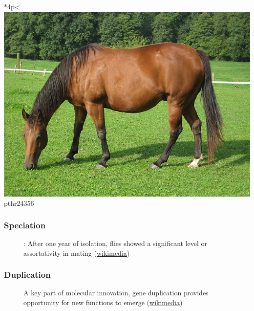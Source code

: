 \documentclass[aspectratio=169, 10pt]{beamer}
\begin{document}
\begin{frame}
\begin{table}
\begin{tabular}{*{4}{p{\tmpwidth}<\centering}}
\includegraphics[width=1\linewidth]{horse.jpg} \linebreak pthr24356
\end{tabular}
\end{table}


\end{frame}

\begin{frame}
\frametitle{Speciation}
\begin{figure}
\centering
\def\svgwidth{.8\linewidth}
\tiny

\caption{: After one year of isolation, flies showed a significant level or assortativity in mating (\href{https://commons.wikimedia.org/wiki/File:Drosophila_speciation_experiment.svg}{wikimedia})}
\end{figure}
\end{frame}

\begin{frame}
\frametitle{Duplication}
\begin{figure}
\centering
\def\svgwidth{.6\linewidth}
\tiny

\caption{A key part of molecular innovation, gene duplication provides opportunity for new functions to emerge (\href{https://en.wikipedia.org/wiki/File:Evolution_fate_duplicate_genes_-_vector.svg}{wikimedia})}
\end{figure}
\end{frame}
\end{document}
